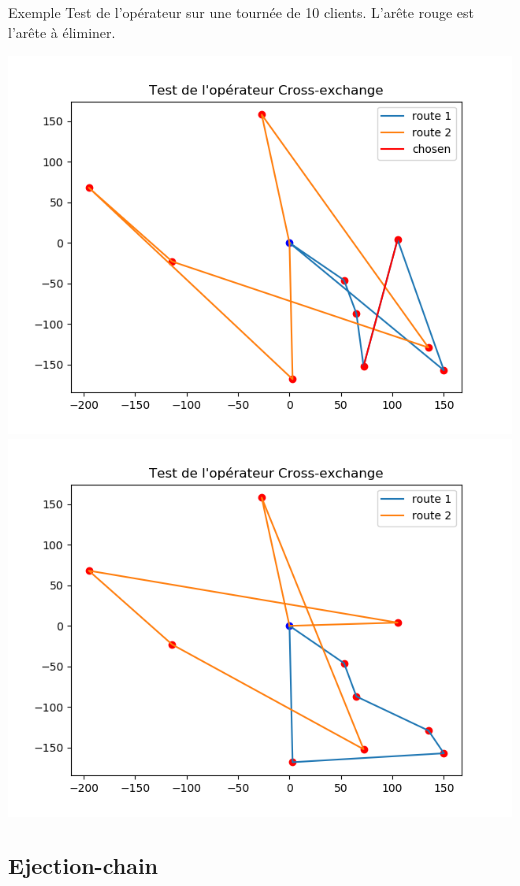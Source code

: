 \documentclass{beamer}
\begin{document}
\begin{frame}{Exemple}
Test de l'opérateur sur une tournée de 10 clients. L'arête rouge est l'arête à éliminer.

\begin{center}
\includegraphics[scale=0.32]{test1CE_init.png}
\includegraphics[scale=0.32]{test1CE_imp.png}
\end{center}

\end{frame}



\subsection{Ejection-chain}
\end{document}
